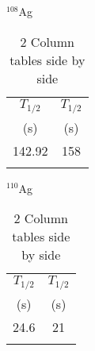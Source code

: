 

\begin{table}[H]
  \begin{subtable}[b]{0.4\textwidth}
    \caption{$^{108}$Ag} \label{lefttable}
    \begin{tabular}{c@{\hskip 1cm} c}
      \hline\noalign{\smallskip}
      $T_{1/2}$ & $T_{1/2}$\\
      (s) & (s)\\
      \hline\noalign{\smallskip}
      142.92 & 158 \\
      \hline\noalign{\smallskip}
    \end{tabular}
  \end{subtable}
  \begin{subtable}[b]{0.4\textwidth}
    \caption{$^{110}$Ag}     \label{righttable}
    \begin{tabular}{c@{\hskip 1cm} c}
      \hline\noalign{\smallskip}
      $T_{1/2}$ & $T_{1/2}$\\
      (s) & (s)\\
      \hline\noalign{\smallskip}
      24.6 & 21 \\
      \hline\noalign{\smallskip}
    \end{tabular}
  \end{subtable}
  \caption{2 Column tables side by side}
  \label{sidebysidetable}
\end{table}
